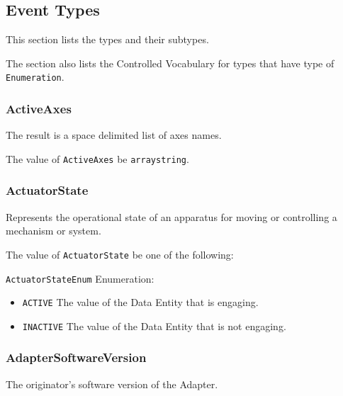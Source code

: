 \subsection{Event Types} \label{sec:Event Types}


This section lists the  types and their subtypes. 

The section also lists the \gls{Controlled Vocabulary} for types that have  type of \texttt{Enumeration}.


\subsubsection{ActiveAxes}
\label{sec:ActiveAxes}



The result is a space delimited list of axes names.


The value of \texttt{ActiveAxes} \MUST be \texttt{arraystring}.



\subsubsection{ActuatorState}
\label{sec:ActuatorState}



Represents the operational state of an apparatus for moving or controlling a mechanism or system.


The value of \texttt{ActuatorState} \MUST be one of the following: 


\texttt{ActuatorStateEnum} Enumeration:

\begin{itemize}
\item \texttt{ACTIVE} \newline The value of the \gls{Data Entity} that is engaging. 
\item \texttt{INACTIVE} \newline The value of the \gls{Data Entity} that is not engaging. 
\end{itemize}



\subsubsection{AdapterSoftwareVersion}
\label{sec:AdapterSoftwareVersion}



The originator’s software version of the \gls{Adapter}.




